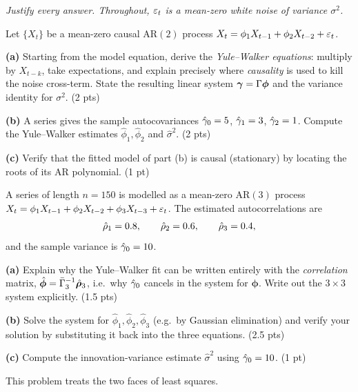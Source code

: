 \documentclass[11pt]{article}
\begin{document}
\pointstable
\begin{center}\itshape Justify every answer. Throughout, $\varepsilon_t$ is a mean-zero white noise of variance $\sigma^2$.\end{center}

Let $\{X_t\}$ be a mean-zero causal $\mathrm{AR}(2)$ process
$X_t=\phi_1X_{t-1}+\phi_2X_{t-2}+\varepsilon_t$.

\textbf{(a)} Starting from the model equation, derive the \emph{Yule--Walker equations}: multiply by $X_{t-k}$, take expectations, and explain precisely where \emph{causality} is used to kill the noise cross-term. State the resulting linear system $\boldsymbol{\gamma}=\Gamma\boldsymbol\phi$ and the variance identity for $\sigma^2$. \hfill(2 pts)

\textbf{(b)} A series gives the sample autocovariances $\hat{\gamma}_0=5$, $\hat{\gamma}_1=3$, $\hat{\gamma}_2=1$. Compute the Yule--Walker estimates $\hat\phi_1,\hat\phi_2$ and $\hat\sigma^2$. \hfill(2 pts)

\textbf{(c)} Verify that the fitted model of part (b) is causal (stationary) by locating the roots of its AR polynomial. \hfill(1 pt)
\answerpage

A series of length $n=150$ is modelled as a mean-zero $\mathrm{AR}(3)$ process
$X_t=\phi_1X_{t-1}+\phi_2X_{t-2}+\phi_3X_{t-3}+\varepsilon_t$. The estimated
autocorrelations are
\[
\hat{\rho}_1=0.8,\qquad \hat{\rho}_2=0.6,\qquad \hat{\rho}_3=0.4,
\]
and the sample variance is $\hat{\gamma}_0=10$.

\textbf{(a)} Explain why the Yule--Walker fit can be written entirely with the \emph{correlation} matrix, $\hat{\boldsymbol\phi}=\bar\Gamma_3^{-1}\hat{\boldsymbol{\rho}}_3$, i.e.\ why $\hat{\gamma}_0$ cancels in the system for $\boldsymbol\phi$. Write out the $3\times3$ system explicitly. \hfill(1.5 pts)

\textbf{(b)} Solve the system for $\hat\phi_1,\hat\phi_2,\hat\phi_3$ (e.g.\ by Gaussian elimination) and verify your solution by substituting it back into the three equations. \hfill(2.5 pts)

\textbf{(c)} Compute the innovation-variance estimate $\hat\sigma^2$ using $\hat{\gamma}_0=10$. \hfill(1 pt)
\answerpage

This problem treats the two faces of least squares.
\end{document}
